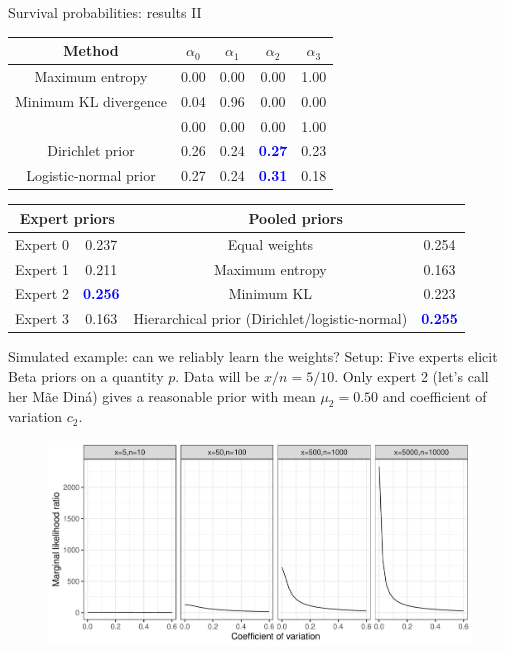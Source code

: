 \begin{frame}{Survival probabilities: results II}
\begin{table}[ht]
\centering
\begin{tabular}{ccccc}
  \hline
Method  & $\alpha_0$ & $\alpha_1$ & $\alpha_2$ & $\alpha_3$ \\ 
  \hline
Maximum entropy & 0.00 & 0.00 & 0.00 & 1.00 \\ 
Minimum KL divergence & 0.04 & 0.96 & 0.00 & 0.00 \\
\cite{rufo2012A} & 0.00 & 0.00 & 0.00& 1.00\\
Dirichlet prior & 0.26 & 0.24 & \textcolor{blue}{\textbf{0.27}} & 0.23 \\ 
Logistic-normal prior & 0.27 & 0.24 & \textcolor{blue}{\textbf{0.31}} & 0.18\\
 \hline
\end{tabular}
\label{tab:alphasBeta}
\end{table}
\begin{table}[ht]
\centering
\begin{tabular}{cccc}
   \hline
   \multicolumn{2}{c}{Expert priors} &  \multicolumn{2}{c}{Pooled priors} \\
   \hline
   Expert 0 & 0.237 & Equal weights & 0.254\\
   Expert 1 & 0.211 & Maximum entropy & 0.163 \\
   Expert 2 & \textcolor{blue}{\textbf{0.256}} & Minimum KL & 0.223 \\ 
   Expert 3 & 0.163 & Hierarchical prior (Dirichlet/logistic-normal) & \textcolor{blue}{\textbf{0.255}} \\
   \hline
\end{tabular}
\label{tab:marglikes}
\end{table}
\end{frame}
\begin{frame}{Simulated example: can we reliably learn the weights?}
Setup:  Five experts elicit Beta priors on a quantity $p$. Data will be $x/n = 5/10$. Only expert 2 (let's call her Mãe Diná) gives a reasonable prior with mean $\mu_2 = 0.50$ and coefficient of variation $c_2$.
\begin{figure}[!ht]
\begin{center}
\includegraphics[scale=.40]{../../plots/beta_MaLs_ratios_oneCorrect_MC.pdf}
\end{center}
\label{fig:one_correct_marglikes}
\end{figure}
\end{frame}
